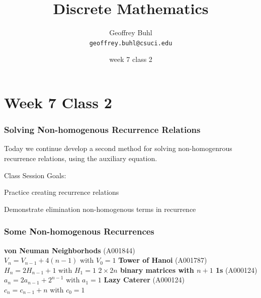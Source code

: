 \documentclass{beamer}
\title{Discrete Mathematics}
\author[Geoffrey Buhl]{Geoffrey Buhl \\ \texttt{geoffrey.buhl@csuci.edu}}
\institute[CSUCI]{California State University Channel Islands}
\date{week 7 class 2}
\newenvironment{packed_enum}{
\begin{enumerate}
  \setlength{\itemsep}{1pt}
  \setlength{\parskip}{0pt}
  \setlength{\parsep}{0pt}
}{\end{enumerate}}
\begin{document}


\section{Week 7 Class 2}


\frame
{
  \frametitle{Solving Non-homogenous Recurrence Relations}

Today we continue  develop a second method for solving non-homogenrous recurrence relations, using the auxiliary equation.

\vfill
Class Session Goals:
\begin{packed_enum}
\item Practice creating recurrence relations
\item Demonstrate elimination non-homogenous terms in recurrence
\end{packed_enum}
\vfill
}

\frame
{
  \frametitle{Some Non-homogenous Recurrences}

{\bf von Neuman Neighborhods} (A001844)\\ $V_n=V_{n-1}+4(n-1)$ with $V_0=1$\vfill
{\bf Tower of Hanoi} (A001787)\\$H_n=2H_{n-1}+1$ with $H_1=1$ \vfill
{\bf $2\times 2n$ binary matrices with $n+1$ 1s} (A000124)\\ $a_n=2a_{n-1}+2^{n-1}$ with $a_1=1$\vfill
{\bf Lazy Caterer} (A000124)\\ $c_n=c_{n-1}+n$ with $c_0=1$\vfill

}

\begin{comment}
\frame
{
  \frametitle{Important Taylor Series}


$\frac{1}{1-x}=1+x+x^2+x^3+x^4+x^5+x^6+ \cdots=\sum_{n=0}^{\infty}x^n$\vfill
$\frac{1}{(1-x)^2}=1+2x+3x^2+4x^3+5x^4+6x^5+ \cdots=\sum_{n=0}^{\infty}(n+1)x^n$\vfill
$\frac{1}{(1-x)^3}=1+3x+6x^2+10x^3+15x^4+21x^5+ \cdots=\sum_{n=0}^{\infty}\frac{(n+1)(n+2)}{2}x^n$\vfill
$\frac{x}{(1-x)^3}=1x+3x^2+6x^3+10x^4+15x^5+21x^6+ \cdots=\sum_{n=0}^{\infty}\frac{n(n+1)}{2}x^n$\vfill
$\frac{1}{1-\alpha x}=1+\alpha x+\alpha^2x^2+\alpha^3x^3+\alpha^4x^4+\alpha^5x^5+ \cdots=\sum_{n=0}^{\infty}\alpha^nx^n$\vfill
$\frac{1}{(1-\alpha x)^2}=1+2\alpha x+3\alpha^2x^2+4\alpha^3x^3+5\alpha^4x^4+6\alpha^5x^5+ \cdots=\sum_{n=0}^{\infty}(n+1)\alpha^nx^n$\vfill


}
\end{comment}
\end{document}
